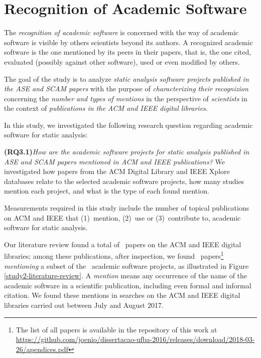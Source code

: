 \section{Recognition of Academic Software}
\label{study2}

The \textit{recognition of academic software} is concerned with the way of
academic software is visible by others scientists beyond its authors. 
A recognized academic software is the one mentioned by its peers in their papers,
that is, the one cited, evaluated (possibly against other software), used or
even modified by others.

%
The goal of the study is to
analyze \textit{static analysis software projects published in the ASE and SCAM
papers} with the purpose of \textit{characterizing their recognizion}
concerning the \textit{number and types of mentions} in the perspective of
\textit{scientists} 
in the context of \textit{publications in the ACM and IEEE
digital libraries}. 

In this study, we investigated the following research question
regarding academic software for static analysis:

\newcommand{\StudyTwoQuestionOne} {
	\textbf{(RQ3.1)}\textit{How are the academic software projects for static analysis published
in ASE and SCAM papers \textit{mentioned} in ACM and IEEE publications?}
}

\noindent \StudyTwoQuestionOne We investigated how papers from the ACM
Digital Library and IEEE Xplore databases relate to the selected academic
software projects,  how many studies mention each project, and what is the type
of each found mention.

Measurements required in this study include 
the number of topical publications on ACM and IEEE that 
(1)~mention, (2)~use or (3)~contribute to, 
academic software for static analysis.
 
%
Our literature review found a total of \SearchUniqueCount \ papers 
on the ACM and IEEE digital libraries; 
among these publications, after inspection, 
we found \ScreeningUniqueCount \ papers\footnote{The list of all papers is available in the repository of this work at \url{https://github.com/joenio/dissertacao-ufba-2016/releases/download/2018-03-26/apendices.pdf}} \textit{mentioning} a subset of the \SoftwareCount \ academic software projects, as illustrated in Figure \ref{study2-literature-review}.
A {\it mention} means any occurrence of the name of the academic software
in a scientific publication, including even formal and informal citation.
We found these mentions in searches on the ACM and IEEE digital libraries 
carried out between July and August 2017.

